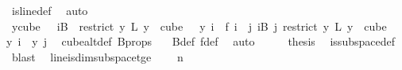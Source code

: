 \begin{isabellebody}
\ is{\isacharunderscore}{\kern0pt}line{\isacharunderscore}{\kern0pt}def\ \isamarkupfalse%
\ auto\isanewline
\ \ \isamarkupfalse%
\ \isamarkupfalse%
\ {\isachardoublequoteopen}{\isacharparenleft}{\kern0pt}{\isasymforall}y{\isasymin}cube\ {}\ {}{\isachardot}{\kern0pt}\ {\isacharparenleft}{\kern0pt}{\isasymforall}i{\isasymin}B\ {}{\isachardot}{\kern0pt}\ {\isacharparenleft}{\kern0pt}restrict\ {\isacharparenleft}{\kern0pt}{\isasymlambda}y{\isachardot}{\kern0pt}\ L\ {\isacharparenleft}{\kern0pt}y\ {}{\isacharparenright}{\kern0pt}{\isacharparenright}{\kern0pt}\ {\isacharparenleft}{\kern0pt}cube\ {}\ {}{\isacharparenright}{\kern0pt}{\isacharparenright}{\kern0pt}\ y\ i\ {\isacharequal}{\kern0pt}\ f\ i{\isacharparenright}{\kern0pt}\ {\isasymand}\ {\isacharparenleft}{\kern0pt}{\isasymforall}j{\isacharless}{\kern0pt}{}{\isachardot}{\kern0pt}\ {\isasymforall}i{\isasymin}B\ j{\isachardot}{\kern0pt}\ {\isacharparenleft}{\kern0pt}restrict\ {\isacharparenleft}{\kern0pt}{\isasymlambda}y{\isachardot}{\kern0pt}\ L\ {\isacharparenleft}{\kern0pt}y\ {}{\isacharparenright}{\kern0pt}{\isacharparenright}{\kern0pt}\ {\isacharparenleft}{\kern0pt}cube\ {}\ {}{\isacharparenright}{\kern0pt}{\isacharparenright}{\kern0pt}\ y\ i\ {\isacharequal}{\kern0pt}\ y\ j{\isacharparenright}{\kern0pt}{\isacharparenright}{\kern0pt}{\isachardoublequoteclose}\ \isamarkupfalse%
\ cube{}{\isacharunderscore}{\kern0pt}alt{\isacharunderscore}{\kern0pt}def\ B{\isacharunderscore}{\kern0pt}props\ {\isacharasterisk}{\kern0pt}\ \isamarkupfalse%
\ B{\isacharunderscore}{\kern0pt}def\ f{\isacharunderscore}{\kern0pt}def\ \isamarkupfalse%
\ auto\isanewline
\ \ \isamarkupfalse%
\ \isamarkupfalse%
\ {\isacharquery}{\kern0pt}thesis\ \isamarkupfalse%
\ is{\isacharunderscore}{\kern0pt}subspace{\isacharunderscore}{\kern0pt}def\ \isamarkupfalse%
\ blast\ \isanewline
{}\isamarkupfalse%
%
\endisatagproof
{\isafoldproof}%
%
\isadelimproof
\isanewline
%
\endisadelimproof
\isanewline
{}\isamarkupfalse%
\ line{\isacharunderscore}{\kern0pt}is{\isacharunderscore}{\kern0pt}dim{}{\isacharunderscore}{\kern0pt}subspace{\isacharunderscore}{\kern0pt}t{\isacharunderscore}{\kern0pt}ge{\isacharunderscore}{\kern0pt}{}{\isacharcolon}{\kern0pt}\ \isanewline
\ \ \ {\isachardoublequoteopen}n\ {\isachargreater}{\kern0pt}\ {}{\isachardoublequoteclose}\isanewline

\end{isabellebody}
